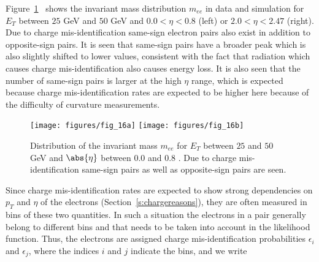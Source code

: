 Figure~\ref{f:meea}~\cite{atlaselcid} shows the invariant mass distribution
$m_{ee}$ in data and simulation for $E_T$ between $25$ GeV and $50$ GeV and
$0.0 < \eta < 0.8$ (left) or $2.0 < \eta < 2.47$ (right). Due to charge
mis-identification same-sign electron pairs also exist in addition to
opposite-sign pairs. It is seen that same-sign pairs have a broader peak which
is also slightly shifted to lower values, consistent with the fact that
radiation which causes charge mis-identification also causes energy loss. It is
also seen that the number of same-sign pairs is larger at the high $\eta$
range, which is expected because charge mis-identification rates are expected
to be higher here because of the difficulty of curvature measurements.

\begin{figure}[H]
	\texttt{[image: figures/fig\_16a]}
	\texttt{[image: figures/fig\_16b]}
	\centering

	\caption{Distribution of the invariant mass $m_{ee}$ for $E_T$ between $25$
		and $50$ GeV and $\abs{\eta} $ between $0.0$ and $0.8$ \cite{atlaselcid}. Due
		to charge mis-identification same-sign pairs as well as opposite-sign pairs
		are seen.}

	\label{f:meea}

\end{figure}


Since charge mis-identification rates are expected to show strong dependencies
on $p_T$ and $\eta$ of the electrons (Section~\ref{s:chargereasons}), they are
often measured in bins of these two quantities. In such a situation the
electrons in a pair generally belong to different bins and that needs to be
taken into account in the likelihood function. Thus, the electrons are assigned
charge mis-identification probabilities $\epsilon_i$ and $\epsilon_j$, where
the indices $i$ and $j$ indicate the bins, and we write


